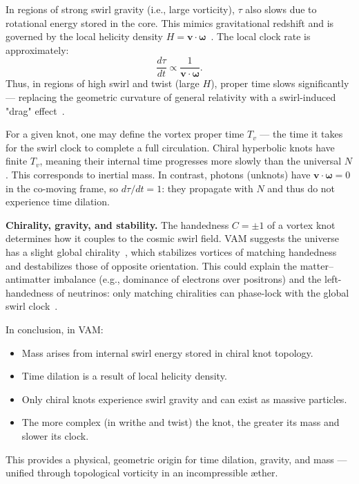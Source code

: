 \documentclass[11pt]{article}
\begin{document}
In regions of strong swirl gravity (i.e., large vorticity), $\tau$ also slows due to rotational energy stored in the core. This mimics gravitational redshift and is governed by the local helicity density $H = \mathbf{v} \cdot \boldsymbol{\omega}$~\cite{iskandarani2025vam5}. The local clock rate is approximately:
\[
\frac{d\tau}{dt} \propto \frac{1}{\mathbf{v} \cdot \boldsymbol{\omega}}.
\]
Thus, in regions of high swirl and twist (large $H$), proper time slows significantly — replacing the geometric curvature of general relativity with a swirl-induced "drag" effect~\cite{iskandarani2025vam5}.

For a given knot, one may define the vortex proper time $T_v$ — the time it takes for the swirl clock to complete a full circulation. Chiral hyperbolic knots have finite $T_v$, meaning their internal time progresses more slowly than the universal $N$. This corresponds to inertial mass. In contrast, photons (unknots) have $\mathbf{v} \cdot \boldsymbol{\omega} = 0$ in the co-moving frame, so $d\tau/dt = 1$: they propagate with $N$ and thus do not experience time dilation.

\textbf{Chirality, gravity, and stability.} The handedness $C = \pm 1$ of a vortex knot determines how it couples to the cosmic swirl field. VAM suggests the universe has a slight global chirality~\cite{iskandarani2025vam5}, which stabilizes vortices of matching handedness and destabilizes those of opposite orientation. This could explain the matter–antimatter imbalance (e.g., dominance of electrons over positrons) and the left-handedness of neutrinos: only matching chiralities can phase-lock with the global swirl clock~\cite{iskandarani2025vam5}.

In conclusion, in VAM:
\begin{itemize}
  \item Mass arises from internal swirl energy stored in chiral knot topology.
  \item Time dilation is a result of local helicity density.
  \item Only chiral knots experience swirl gravity and can exist as massive particles.
  \item The more complex (in writhe and twist) the knot, the greater its mass and slower its clock.
\end{itemize}

This provides a physical, geometric origin for time dilation, gravity, and mass — unified through topological vorticity in an incompressible æther.
\end{document}
